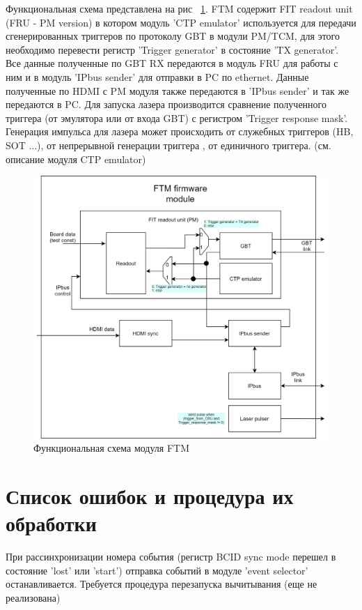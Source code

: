 \documentclass{article}
\begin{document}
Функциональная схема представлена на рис ~\ref{fig:6}. FTM содержит FIT readout unit (FRU - PM version) в котором модуль 'CTP emulator' используется для передачи сгенерированных триггеров по протоколу GBT в модули PM/TCM, для этого необходимо перевести регистр 'Trigger generator' в состояние 'TX generator'. Все данные полученные по GBT RX передаются в модуль FRU для работы с ним и в модуль 'IPbus sender' для отправки в PC по ethernet. Данные полученные по HDMI с PM модуля также передаются в 'IPbus sender' и так же передаются в PC. Для запуска лазера производится сравнение полученного триггера (от эмулятора или от входа GBT) с регистром 'Trigger response mask'. Генерация импульса для лазера может происходить от служебных триггеров (HB, SOT ...), от непрерывной генерации триггера , от единичного триггера. (см. описание модуля CTP emulator)




\begin{figure}[H]
	\centering 
	\includegraphics[width=1\textwidth]{FTM_sch.png}
	\caption{\label{fig:6} Функциональная схема модуля FTM}
\end{figure}



\section{Список ошибок и процедура их обработки}
При рассинхронизации номера события (регистр BCID sync mode перешел в состояние 'lost' или 'start') отправка событий в модуле 'event selector' останавливается.
Требуется процедура перезапуска вычитывания (еще не реализована)
\end{document}
